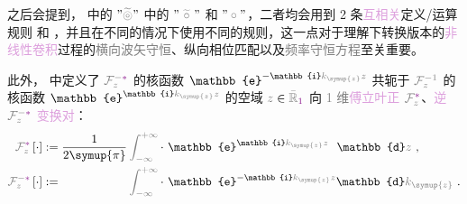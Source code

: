 之后会提到， 中的 $"\mathcolor{gray}{\widetilde \circledcirc}"$ 中的 $"~\mathcolor{gray}{\widetilde \circ}~"$ 和 $"\mathcolor{gray}{\circ}"$，二者均会用到 2 条\textcolor{Plum}{互相关}定义/运算规则  和 ，并且在不同的情况下使用不同的规则，这一点对于理解下转换版本的\textcolor{Plum}{非线性}\textcolor{Plum}{卷积}过程的\textcolor{gray}{横向波矢守恒}、\textcolor{PineGreen}{纵向相位匹配}以及\textcolor{gray}{频率守恒方程}至关重要。

此外， 中定义了 $\mathcolor{gray}{\mathcal F_{z}^{-\mathcolor{Plum}{*}}}$ 的核函数 $\mathbb{e}^{-\mathbb{i}\mathcolor{gray}{k_{\symup{z}}} \mathcolor{gray}{z}}$ 共轭于 $\mathcolor{gray}{\mathcal F_{z}^{-1}}$ 的核函数 $\mathbb{e}^{\mathbb{i}\mathcolor{gray}{k_{\symup{z}}} \mathcolor{gray}{z}}$ 的空域 $\mathcolor{gray}{z} \in \mathcolor{gray}{\bar{\mathbb{R}}_{\textcolor{Plum}{1}}}$ 向 \textcolor{gray}{1 维}\textcolor{Plum}{傅立叶正} $\mathcolor{gray}{\mathcal F_{z}^{\mathcolor{Plum}{*}}}$、\textcolor{Plum}{逆} $\mathcolor{gray}{\mathcal F_{z}^{-\mathcolor{Plum}{*}}}$ \textcolor{Plum}{变换对}：
\begin{subequations} \label{eq:FT*-z_kz}
\begin{align}
	\mathcolor{gray}{\mathcal F_{z}^{\mathcolor{Plum}{*}}} \left[ \cdot \right] &:= \frac{ 1 }{ 2\symup{\pi} } \mathcolor{gray}{\int_{-\infty}^{+\infty}} \cdot~ \mathbb{e}^{\mathbb{i}\mathcolor{gray}{k_{\symup{z}}} \mathcolor{gray}{z}} \hphantom{^-} \mathbb{d}\mathcolor{gray}{z} ~, \label{eq:FT*-kz} \\
	\mathcolor{gray}{\mathcal F_{z}^{-\mathcolor{Plum}{*}}} \left[ \cdot \right] &:= \hphantom{\frac{ 1 }{ 2\symup{\pi} }} \mathcolor{gray}{\int_{-\infty}^{+\infty}} \cdot~ \mathbb{e}^{-\mathbb{i}\mathcolor{gray}{k_{\symup{z}}} \mathcolor{gray}{z}} \mathbb{d}\mathcolor{gray}{k_{\symup{z}}} ~. \label{eq:IFT*-z}
\end{align}
\end{subequations}

